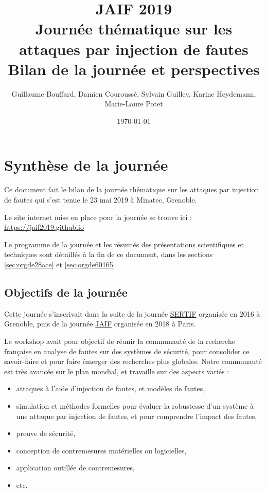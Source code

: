 \documentclass[a4paper,11pt]{article}
\author{Guillaume Bouffard,  Damien Couroussé, Sylvain Guilley,  Karine Heydemann, Marie-Laure Potet}
\date{\today}
\title{JAIF 2019 \\ Journée thématique sur les attaques par injection de fautes\\\medskip
\large Bilan de la journée et perspectives}
\begin{document}
\maketitle
\tableofcontents


\section{Synthèse de la journée}
\label{sec:org1cc37e9}

Ce document fait le bilan de la journée thématique sur les attaques
par injection de fautes qui s'est tenue le 23 mai 2019 à Minatec, Grenoble.

Le site internet mise en place pour la journée se trouve ici :
\url{https://jaif2019.github.io}


Le programme de la journée et les résumés des présentations
scientifiques et techniques sont détaillés à la fin de ce document,
dans les sections \ref{sec:orgde28ace} et \ref{sec:orgde60165}.

\subsection{Objectifs de la journée}
\label{sec:orgfd582d4}

Cette journée s’inscrivait dans la suite de la journée \href{https://lazart.gricad-pages.univ-grenoble-alpes.fr/sertif/pages/workshop.html}{SERTIF} organisée
en 2016 à Grenoble,
puis de la journée \href{https://wp-systeme.lip6.fr/jaif}{JAIF} organisée en 2018 à Paris.

Le workshop avait pour objectif de réunir la communauté de la
recherche française en analyse de fautes sur des systèmes de sécurité,
pour consolider ce savoir-faire et pour faire émerger des recherches
plus globales.  Notre communauté est très avancée sur le plan mondial,
et travaille sur des aspects variés :

\begin{itemize}
\item attaques à l'aide d'injection de fautes, et modèles de fautes,
\item simulation et méthodes formelles pour évaluer la robustesse d'un
système à une attaque par injection de fautes, et pour comprendre
l’impact des fautes,
\item preuve de sécurité,
\item conception de contremesures matérielles ou logicielles,
\item application outillée de contremesures,
\item etc.
\end{itemize}
\end{document}
